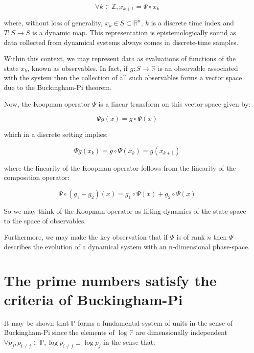 \documentclass{article}
\begin{document}
\begin{equation}
\forall k \in \mathbb{Z}, x_{k+1} = \Psi \circ x_k
\end{equation}

where, without loss of generality, $x_k \in S \subset \mathbb{R}^n$, $k$ is a discrete time index and $T:S \rightarrow S$ is a dynamic map. This representation is epistemologically sound as data collected from dynamical systems always comes in discrete-time samples.

Within this context, we may represent data as evaluations of functions of the state $x_k$, known as observables. In fact, if $g: S \rightarrow \mathbb{R}$ is an observable associated with the system then the collection of all such observables forms a vector space due to the Buckingham-Pi theorem.

Now, the Koopman operator $\Psi$ is a linear transform on this vector space given by:

\begin{equation}
\Psi g(x) = g \circ \Psi(x)
\end{equation}

which in a discrete setting implies:

\begin{equation}
\Psi g(x_k) = g \circ \Psi(x_k) = g(x_{k+1})
\end{equation}

where the linearity of the Koopman operator follows from the linearity of the composition operator:

\begin{equation}
\Psi \circ (g_1 + g_2)(x) = g_1 \circ \Psi(x) + g_2 \circ \Psi(x)
\end{equation}

So we may think of the Koopman operator as lifting dynamics of the state space to the space of observables.

Furthermore, we may make the key observation that if $\Psi$ is of rank $n$ then $\Psi$ describes the
evolution of a dynamical system with an n-dimensional phase-space.

\newpage 

\section{The prime numbers satisfy the criteria of Buckingham-Pi}

It may be shown that $\mathbb{P}$ forms a fundamental system of units in the sense of Buckingham-Pi since the
elements of $\log \mathbb{P}$ are dimensionally independent $\forall p_j, p_{i \neq j} \in \mathbb{P}, \log p_{i \neq j} \perp \log p_j$ in the sense that:
\end{document}
